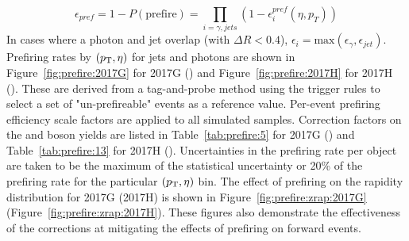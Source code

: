 
\begin{equation}
    \epsilon_{pref} = 1 - P(\mathrm{prefire}) = \prod_{i=\gamma,jets}{(1 - \epsilon_i^{pref}(\eta,p_T))}
    \label{eq:prefiring_weight}
\end{equation}
In cases where a photon and jet overlap (with $\Delta  R < 0.4$), $\epsilon_i=\mathrm{max}(\epsilon_\gamma,\epsilon_{jet})$.
Prefiring rates by $(p_{\mathrm{T}},\eta)$ for jets and photons are shown in Figure~\ref{fig:prefire:2017G} for 2017G (\sg) and Figure~\ref{fig:prefire:2017H} for 2017H (\sh). These are derived from a tag-and-probe method using the trigger rules to select a set of "un-prefireable" events as a reference value. Per-event prefiring efficiency scale factors are applied to all simulated samples. Correction factors on the \Wpm and \Z boson yields are listed in Table~\ref{tab:prefire:5} for 2017G (\sg) and Table~\ref{tab:prefire:13} for 2017H (\sh). Uncertainties in the prefiring rate per object are taken to be the maximum of the statistical uncertainty or 20\% of the prefiring rate for the particular $(p_{\mathrm{T}},\eta)$ bin. The effect of prefiring on the \zee rapidity distribution for 2017G (2017H) is shown in  Figure~\ref{fig:prefire:zrap:2017G} (Figure~\ref{fig:prefire:zrap:2017H}). These figures also demonstrate the effectiveness of the corrections at mitigating the effects of prefiring on forward events.


